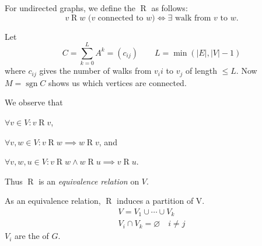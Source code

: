 \begin{definition}
For undirected graphs, we define the  $\operatorname{R}$ as follows:
\[ v \operatorname{R} w \text{ ($v$ connected to $w$)} \iff \exists\text{ walk from $v$ to $w$}. \]
\end{definition}

Let
\[ C = \sum_{k=0}^L A^k = (c_{ij})\qquad L = \min(|E|, |V|-1) \]
where $c_{ij}$ gives the number of walks from $v_ii$ to $v_j$ of length $\leq
L$. Now $M = \operatorname{sgn} C$ shows us which vertices are connected.

We observe that
\begin{compactitem}
\item $\forall v\in V: v \operatorname{R} v$,
\item $\forall v,w\in V: v \operatorname{R} w \implies w \operatorname{R} v$, and
\item $\forall v,w,u\in V: v \operatorname{R} w \wedge w \operatorname{R} u \implies v \operatorname{R} u$.
\end{compactitem}
Thus $\operatorname{R}$ is an \emph{equivalence relation} on $V$.

As an equivalence relation, $\operatorname{R}$ induces a partition of V.
\begin{gather*}
V = V_1 \cup\cdots\cup V_k \\
V_i \cap V_k = \varnothing\quad i\neq j
\end{gather*}
%
$V_i$ are the  of $G$.

